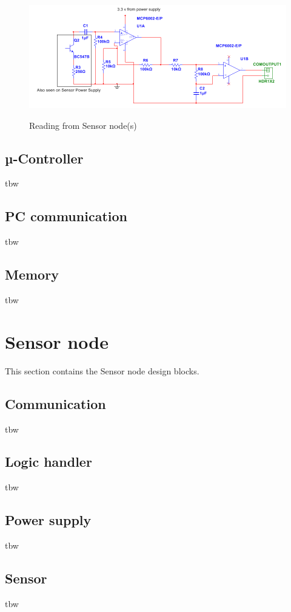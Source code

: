\begin{figure}[H]
\centering
\includegraphics[width=1\textwidth]{billeder/cdusensorread}
\label{fig:cdusensorread}
\caption{Reading from Sensor node(s)}
\end{figure}



\subsection{µ-Controller}
tbw

\subsection{PC communication}
tbw

\subsection{Memory}
tbw

\section{Sensor node}
This section contains the Sensor node design blocks.
\subsection{Communication}
tbw

\subsection{Logic handler}
tbw

\subsection{Power supply}
tbw

\subsection{Sensor}
tbw